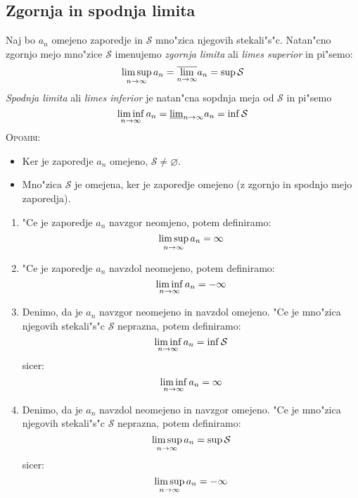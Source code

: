 \subsection{Zgornja in spodnja limita}
 Naj bo $a_n$ omejeno zaporedje in $\mathcal{S}$ mno"zica njegovih stekali"s"c. Natan"cno zgornjo mejo mno"zice $\mathcal{S}$ imenujemo \emph{zgornja limita} ali \emph{limes superior} in pi"semo:
\begin{equation*}
\limsup_{n \rightarrow \infty} a_n = \overline{\lim_{n \rightarrow \infty}}a_n = \sup \mathcal{S}
\end{equation*}
\emph{Spodnja limita} ali \emph{limes inferior} je natan"cna sopdnja meja od $\mathcal{S}$ in pi"semo
\begin{equation*}
\liminf_{n \rightarrow \infty} a_n = \underline{\lim}_{n \rightarrow \infty} a_n = \inf \mathcal{S}
\end{equation*}
\textsc{Opombi:} 
\begin{itemize}
	\item Ker je zaporedje $a_n$ omejeno, $\mathcal{S} \neq \varnothing$. 
	\item Mno"zica $\mathcal{S}$ je omejena, ker je zaporedje omejeno (z zgornjo in spodnjo mejo zaporedja).
\end{itemize}
%
\begin{enumerate}[(1)]
	\item "Ce je zaporedje $a_n$ navzgor neomjeno, potem definiramo:
	\begin{equation*}
		\limsup_{n \rightarrow \infty} a_n = \infty
	\end{equation*}
	
	\item "Ce je zaporedje $a_n$ navzdol neomejeno, potem definiramo:
	\begin{equation*}
		\liminf_{n \rightarrow \infty} a_n = - \infty
	\end{equation*}
	
	\item Denimo, da je $a_n$ navzgor neomejeno in navzdol omejeno. "Ce je mno"zica njegovih stekali"s"c $\mathcal{S}$ neprazna, potem definiramo:
	\begin{equation*}
	\liminf_{n \rightarrow \infty} a_n = \inf \mathcal{S}
	\end{equation*}
	sicer:
	\begin{equation*}
	\liminf_{n \rightarrow \infty} a_n = \infty
	\end{equation*}
	
	\item Denimo, da je $a_n$ navzdol neomejeno in navzgor omejeno. "Ce je mno"zica njegovih stekali"s"c $\mathcal{S}$ neprazna, potem definiramo:
	\begin{equation*}
	\limsup_{n \rightarrow \infty} a_n = \sup \mathcal{S}
	\end{equation*}
	sicer:
	\begin{equation*}
	\limsup_{n \rightarrow \infty} a_n = - \infty
	\end{equation*}
\end{enumerate}
